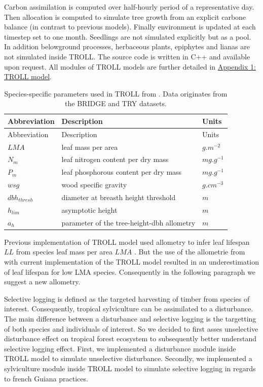 \documentclass[12pt,]{article}
\theoremstyle{definition}
\theoremstyle{definition}
\theoremstyle{remark}
\begin{document}
Carbon assimilation is computed over half-hourly period of a
representative day. Then allocation is computed to simulate tree growth
from an explicit carbone balance (in contrast to previous models).
Finally environment is updated at each timestep set to one month.
Seedlings are not simulated explicitly but as a pool. In addition
belowground processes, herbaceous plants, epiphytes and lianas are not
simulated inside TROLL. The source code is written in C++ and available
upon request. All modules of TROLL models are further detailed in
\protect\hyperlink{appendix-1-troll-model}{Appendix 1: TROLL model}.

\begin{longtable}[]{@{}lll@{}}
\caption{\label{tab:traits}Species-specific parameters used in TROLL from
\citet{Li}. Data originates from the BRIDGE \citep{Baraloto2010} and TRY
\citep{Kattge2011} datasets.}\tabularnewline
\toprule
Abbreviation & Description & Units\tabularnewline
\midrule
\endfirsthead
\toprule
Abbreviation & Description & Units\tabularnewline
\midrule
\endhead
\(LMA\) & leaf mass per area & \(g.m^{-2}\)\tabularnewline
\(N_m\) & leaf nitrogen content per dry mass &
\(mg.g^{-1}\)\tabularnewline
\(P_m\) & leaf phosphorous content per dry mass &
\(mg.g^{-1}\)\tabularnewline
\(wsg\) & wood specific gravity & \(g.cm^{-3}\)\tabularnewline
\(dbh_{thresh}\) & diameter at breasth height threshold &
\(m\)\tabularnewline
\(h_{lim}\) & asymptotic height & \(m\)\tabularnewline
\(a_h\) & parameter of the tree-height-dbh allometry &
\(m\)\tabularnewline
\bottomrule
\end{longtable}

Previous implementation of TROLL model used \citet{Reich1991a} allometry
to infer leaf lifespan \(LL\) from species leaf mass per area \(LMA\)
\citep[see \protect\hyperlink{appendix-1-troll-model}{Appendix 1: TROLL
model}]{Li}. But the use of the allometrie from \citet{Reich1991a} with
current implementation of the TROLL model resulted in an underestimation
of leaf lifespan for low LMA species. Consequently in the following
paragraph we suggest a new allometry.

Selective logging is defined as the targeted harvesting of timber from
species of interest. Consequently, tropical sylviculture can be
assimilated to a disturbance. The main difference between a disturbance
and selective logging is the targetting of both species and individuals
of interest. So we decided to first asses unselective disturbance effect
on tropical forest ecosystem to subsequently better understand selective
logging effect. First, we implemented a disturbance module inside TROLL
model to simulate unselective disturbance. Secondly, we implemented a
sylviculture module inside TROLL model to simulate selective logging in
regards to french Guiana practices.
\end{document}

